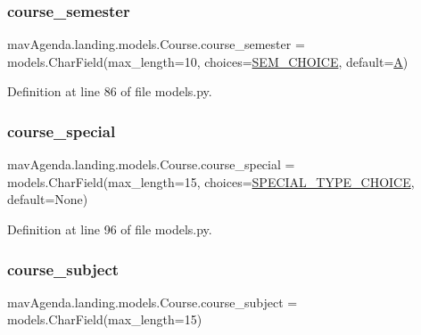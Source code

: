 \subsubsection{\texorpdfstring{course\+\_\+semester}{course\_semester}}
{\footnotesize\ttfamily mav\+Agenda.\+landing.\+models.\+Course.\+course\+\_\+semester = models.\+Char\+Field(max\+\_\+length=10, choices=\mbox{\hyperlink{classmavAgenda_1_1landing_1_1models_1_1Course_ae05d55465b858136d199cf3fb56c1cd9}{S\+E\+M\+\_\+\+C\+H\+O\+I\+CE}}, default=\mbox{\hyperlink{classmavAgenda_1_1landing_1_1models_1_1Course_ac88ad8d55bb2f4ce8395b5691a545cf7}{A}})\hspace{0.3cm}{\ttfamily [static]}}



Definition at line 86 of file models.\+py.

\mbox{\label{classmavAgenda_1_1landing_1_1models_1_1Course_a5f117674611634b01e100c61462d02a6}} 
\subsubsection{\texorpdfstring{course\+\_\+special}{course\_special}}
{\footnotesize\ttfamily mav\+Agenda.\+landing.\+models.\+Course.\+course\+\_\+special = models.\+Char\+Field(max\+\_\+length=15, choices=\mbox{\hyperlink{classmavAgenda_1_1landing_1_1models_1_1Course_a810babb1a1eb7ec206989017427fd2af}{S\+P\+E\+C\+I\+A\+L\+\_\+\+T\+Y\+P\+E\+\_\+\+C\+H\+O\+I\+CE}}, default=None)\hspace{0.3cm}{\ttfamily [static]}}



Definition at line 96 of file models.\+py.

\mbox{\label{classmavAgenda_1_1landing_1_1models_1_1Course_a00f85c8e8f12e5f0bd4a1cfd3acdc1b2}} 
\subsubsection{\texorpdfstring{course\+\_\+subject}{course\_subject}}
{\footnotesize\ttfamily mav\+Agenda.\+landing.\+models.\+Course.\+course\+\_\+subject = models.\+Char\+Field(max\+\_\+length=15)\hspace{0.3cm}{\ttfamily [static]}}




